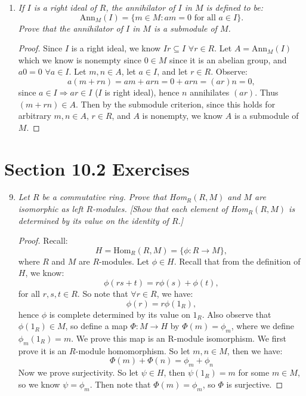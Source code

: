 \documentclass[10pt,oneside,reqno]{amsart}
\theoremstyle{plain}
\newcommand{\sub}{\subseteq}
\theoremstyle{definition}
\theoremstyle{remark}
\begin{document}
\begin{enumerate}[label=\arabic*.]
\vspace{3mm}

\item \textit{If $I$ is a right ideal of $R$, the annihilator of $I$ in $M$ is defined to be: 
$$
\text{Ann}_M(I) = \{m \in M:am = 0 \text{ for all }a \in I\}.
$$
Prove that the annihilator of $I$ in $M$ is a submodule of $M$. 
}
\begin{proof}
Since $I$ is a right ideal, we know $Ir \sub I$ $\forall r \in R$. Let $A = \text{Ann}_M(I)$ which we know is nonempty since $0 \in M$ since it is an abelian group, and $a0 = 0$ $\forall a \in I$. Let $m,n \in A$, let $a \in I$, and let $r \in R$. Observe: 
$$
a(m + rn) = am + arn = 0 + arn = (ar)n = 0,
$$
since $a \in I \Rightarrow ar \in I$ ($I$ is right ideal), hence $n$ annihilates $(ar)$. Thus $(m + rn) \in A$. Then by the submodule criterion, since this holds for arbitrary $m,n  \in A$, $r \in R$, and $A$ is nonempty, we know $A$ is a submodule of $M$. 
\end{proof}
\end{enumerate}

\section*{Section 10.2 Exercises}

\begin{enumerate}[label=\arabic*.]
\setcounter{enumi}{8}
\item \textit{Let $R$ be a commutative ring. Prove that Hom$_R(R,M)$ and $M$ are isomorphic as left $R$-modules. [Show that each element of Hom$_R(R,M)$ is determined by its value on the identity of $R$.]}

\begin{proof}
Recall:
$$
H = \text{Hom}_R(R,M) = \{\phi:R \to M\},
$$
where $R$ and $M$ are $R$-modules. Let $\phi \in H$. Recall that from the definition of $H$, we know:
$$
\phi(rs + t) = r\phi(s) + \phi(t),
$$
for all $r,s,t \in R$. So note that $\forall r \in R$, we have:
$$
\phi(r) = r\phi(1_R),
$$
hence $\phi$ is complete determined by its value on $1_R$. Also observe that $\phi(1_R) \in M$, so define a map $\Phi:M \to H$ by $\Phi(m) = \phi_m$, where we define $\phi_m(1_R) = m$. We prove this map is an R-module isomorphism. We first prove it is an $R$-module homomorphism. So let $m,n \in M$, then we have:
$$
\Phi(m) + \Phi(n) = \phi_m + \phi_n
$$
Now we prove surjectivity. So let $\psi \in H$, then $\psi(1_R) = m$ for some $m \in M$, so we know $\psi = \phi_m$. Then note that $\Phi(m) = \phi_m$, so $\Phi$ is surjective. 
\end{proof}
\end{enumerate}
\end{document}
